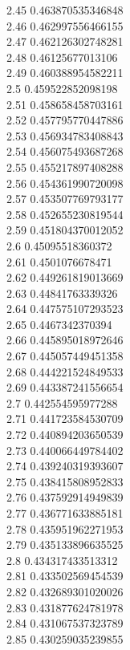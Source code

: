 {2.45	0.463870535346848\\
2.46	0.462997556466155\\
2.47	0.462126302748281\\
2.48	0.46125677013106\\
2.49	0.460388954582211\\
2.5	0.459522852098198\\
2.51	0.458658458703161\\
2.52	0.457795770447886\\
2.53	0.456934783408843\\
2.54	0.456075493687268\\
2.55	0.455217897408288\\
2.56	0.454361990720098\\
2.57	0.453507769793177\\
2.58	0.452655230819544\\
2.59	0.451804370012052\\
2.6	0.45095518360372\\
2.61	0.4501076678471\\
2.62	0.449261819013669\\
2.63	0.44841763339326\\
2.64	0.447575107293523\\
2.65	0.4467342370394\\
2.66	0.445895018972646\\
2.67	0.445057449451358\\
2.68	0.444221524849533\\
2.69	0.443387241556654\\
2.7	0.442554595977288\\
2.71	0.441723584530709\\
2.72	0.440894203650539\\
2.73	0.440066449784402\\
2.74	0.439240319393607\\
2.75	0.438415808952833\\
2.76	0.437592914949839\\
2.77	0.436771633885181\\
2.78	0.435951962271953\\
2.79	0.435133896635525\\
2.8	0.434317433513312\\
2.81	0.433502569454539\\
2.82	0.432689301020026\\
2.83	0.431877624781978\\
2.84	0.431067537323789\\
2.85	0.430259035239855\\
}
